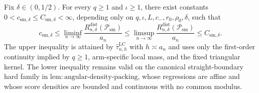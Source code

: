 Fix \(\delta\in(0,1/2)\). For every \(q\geq1\) and \(\iota\geq1\), there exist constants \(0<c_{\mathrm{sm},\delta}\leq C_{\mathrm{sm},\delta}<\infty\), depending only on \(q,\iota,L,c_{-},r_0,\rho_0,\delta\), such that \[c_{\mathrm{sm},\delta}\leq\liminf_{n\to\infty}\frac{R_{n,\delta}^{\mathrm{dist}}(\mathcal{P}_{\mathrm{sm}})}{a_n}\leq\limsup_{n\to\infty}\frac{R_{n,\delta}^{\mathrm{dist}}(\mathcal{P}_{\mathrm{sm}})}{a_n}\leq C_{\mathrm{sm},\delta}.\] The upper inequality is attained by \(\widehat{\tau}^{\mathrm{LC}}_{n,h}\) with \(h\asymp a_n\) and uses only the first-order continuity implied by \(q\geq1\), arm-specific local mass, and the fixed triangular kernel. The lower inequality remains valid on the canonical straight-boundary hard family in \(\mathrm{lem:angular\text{-}density\text{-}packing}\), whose regressions are affine and whose score densities are bounded and continuous with no common modulus.